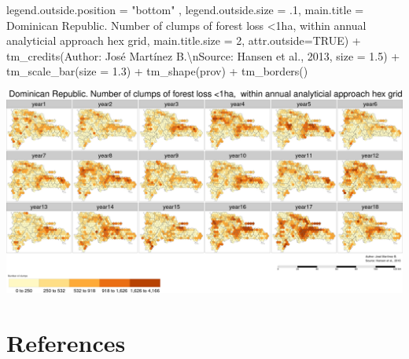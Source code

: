 \documentclass[10pt,landscape,a3paper]{article}
\newenvironment{Shaded}{\begin{snugshade}}{\end{snugshade}}
\newcommand{\AttributeTok}[1]{\textcolor[rgb]{0.77,0.63,0.00}{#1}}
\newcommand{\ConstantTok}[1]{\textcolor[rgb]{0.00,0.00,0.00}{#1}}
\newcommand{\DecValTok}[1]{\textcolor[rgb]{0.00,0.00,0.81}{#1}}
\newcommand{\FloatTok}[1]{\textcolor[rgb]{0.00,0.00,0.81}{#1}}
\newcommand{\FunctionTok}[1]{\textcolor[rgb]{0.00,0.00,0.00}{#1}}
\newcommand{\NormalTok}[1]{#1}
\newcommand{\SpecialCharTok}[1]{\textcolor[rgb]{0.00,0.00,0.00}{#1}}
\newcommand{\StringTok}[1]{\textcolor[rgb]{0.31,0.60,0.02}{#1}}
\begin{document}
\begin{Shaded}
\begin{Highlighting}[]
            \AttributeTok{legend.outside.position =} \StringTok{"bottom"}\NormalTok{ , }\AttributeTok{legend.outside.size =}\NormalTok{ .}\DecValTok{1}\NormalTok{,}
            \AttributeTok{main.title =} \StringTok{\textquotesingle{}Dominican Republic. Number of clumps of forest loss \textless{}1ha,  within annual analyticial approach hex grid\textquotesingle{}}\NormalTok{,}
            \AttributeTok{main.title.size =} \DecValTok{2}\NormalTok{, }\AttributeTok{attr.outside=}\ConstantTok{TRUE}\NormalTok{) }\SpecialCharTok{+} 
  \FunctionTok{tm\_credits}\NormalTok{(}\StringTok{\textquotesingle{}Author: José Martínez B.}\SpecialCharTok{\textbackslash{}n}\StringTok{Source: Hansen et al., 2013\textquotesingle{}}\NormalTok{, }\AttributeTok{size =} \FloatTok{1.5}\NormalTok{) }\SpecialCharTok{+}
  \FunctionTok{tm\_scale\_bar}\NormalTok{(}\AttributeTok{size =} \FloatTok{1.3}\NormalTok{) }\SpecialCharTok{+}
  \FunctionTok{tm\_shape}\NormalTok{(prov) }\SpecialCharTok{+} \FunctionTok{tm\_borders}\NormalTok{()}
\end{Highlighting}
\end{Shaded}

\begin{center}\includegraphics{img/data-download-preparation-eda/zonal-annual-grid-5} \end{center}

\hypertarget{references}{%
\section*{References}\label{references}}
\end{document}
